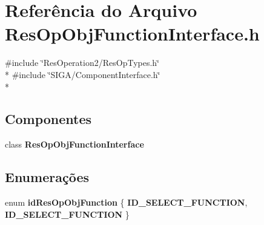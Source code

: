 \section{Referência do Arquivo Res\+Op\+Obj\+Function\+Interface.\+h}
\label{_2_obj_function_2_res_op_obj_function_interface_8h}
{\ttfamily \#include \char`\"{}Res\+Operation2/\+Res\+Op\+Types.\+h\char`\"{}}\\*
{\ttfamily \#include \char`\"{}S\+I\+G\+A/\+Component\+Interface.\+h\char`\"{}}\\*
\subsection*{Componentes}
\begin{DoxyCompactItemize}
\item 
class {\bf Res\+Op\+Obj\+Function\+Interface}
\end{DoxyCompactItemize}
\subsection*{Enumerações}
\begin{DoxyCompactItemize}
\item 
enum {\bf id\+Res\+Op\+Obj\+Function} \{ {\bf I\+D\+\_\+\+S\+E\+L\+E\+C\+T\+\_\+\+F\+U\+N\+C\+T\+I\+ON}, 
{\bf I\+D\+\_\+\+S\+E\+L\+E\+C\+T\+\_\+\+F\+U\+N\+C\+T\+I\+ON}
 \}
\end{DoxyCompactItemize}
